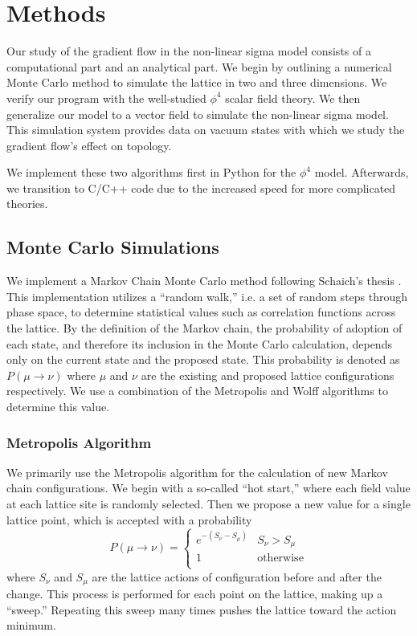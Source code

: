 \documentclass[12pt]{report}
\begin{document}
\chapter{Methods}
\label{sec:methods}
Our study of the gradient flow in the non-linear sigma model consists of a computational part and an analytical part. We begin by outlining a numerical Monte Carlo method to simulate the lattice in two and three dimensions. We verify our program with the well-studied $\phi^4$ scalar field theory. We then generalize our model to a vector field to simulate the non-linear sigma model. This simulation system provides data on vacuum states with which we study the gradient flow's effect on topology.

We implement these two algorithms first in Python for the $\phi^4$ model. Afterwards, we transition to C/C++ code due to the increased speed for more complicated theories. 

\section{Monte Carlo Simulations}
\label{sec:mc}

We implement a Markov Chain Monte Carlo method following Schaich's thesis \cite{schaich2006}. This implementation utilizes a ``random walk,'' i.e. a set of random steps through phase space, to determine statistical values such as correlation functions across the lattice. By the definition of the Markov chain, the probability of adoption of each state, and therefore its inclusion in the Monte Carlo calculation, depends only on the current state and the proposed state. This probability is denoted as $P(\mu\rightarrow\nu)$ where $\mu$ and $\nu$ are the existing and proposed lattice configurations respectively. We use a combination of the Metropolis and Wolff algorithms to determine this value.

\subsection{Metropolis Algorithm}
We primarily use the Metropolis algorithm for the calculation of new Markov chain configurations. We begin with a so-called ``hot start,'' where each field value at each lattice site is randomly selected. Then we propose a new value for a single lattice point, which is accepted with a probability
\begin{equation}
    P(\mu\rightarrow\nu) = \begin{cases} 
        e^{-(S_\nu - S_\mu)} & S_\nu > S_\mu \\
        1 & \mathrm{otherwise} \\
   \end{cases}
\end{equation}
where $S_\nu$ and $S_\mu$ are the lattice actions of configuration before and after the change. This process is performed for each point on the lattice, making up a ``sweep.'' Repeating this sweep many times pushes the lattice toward the action minimum.
\end{document}
